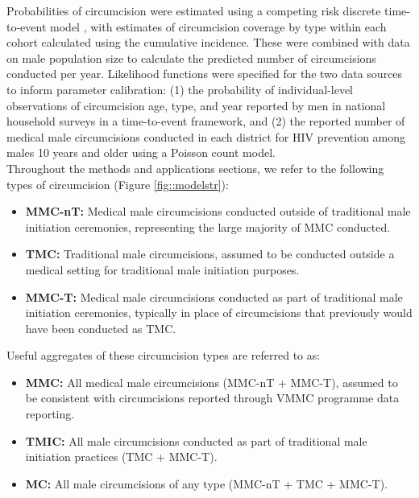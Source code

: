 \documentclass{article}
\begin{document}
\begin{appendix}
\noindent Probabilities of circumcision were estimated using a competing risk discrete time-to-event model \cite{putter2006tutorial}, with estimates of circumcision coverage by type within each cohort calculated using the cumulative incidence. These were combined with data on male population size to calculate the predicted number of circumcisions conducted per year. Likelihood functions were specified for the two data sources to inform parameter calibration: (1) the probability of individual-level observations of circumcision age, type, and year reported by men in national household surveys in a time-to-event framework, and (2) the reported number of medical male circumcisions conducted in each district for HIV prevention among males 10 years and older using a Poisson count model. \\

\noindent Throughout the methods and applications sections, we refer to the following types of circumcision (Figure \ref{fig::modelstr}):
\begin{itemize}
    \item \textbf{MMC-nT:} Medical male circumcisions conducted outside of traditional male initiation ceremonies, representing the large majority of MMC conducted.
    \item \textbf{TMC:} Traditional male circumcisions, assumed to be conducted outside a medical setting for traditional male initiation purposes.
    \item \textbf{MMC-T:} Medical male circumcisions conducted as part of traditional male initiation ceremonies, typically in place of circumcisions that previously would have been conducted as TMC.
\end{itemize}
Useful aggregates of these circumcision types are referred to as:
\begin{itemize}
    \item \textbf{MMC:} All medical male circumcisions (MMC-nT + MMC-T), assumed to be consistent with circumcisions reported through VMMC programme data reporting.
    \item \textbf{TMIC:} All male circumcisions conducted as part of traditional male initiation practices (TMC + MMC-T).
    \item \textbf{MC:} All male circumcisions of any type (MMC-nT + TMC + MMC-T).
\end{itemize}


\end{appendix}
\end{document}
